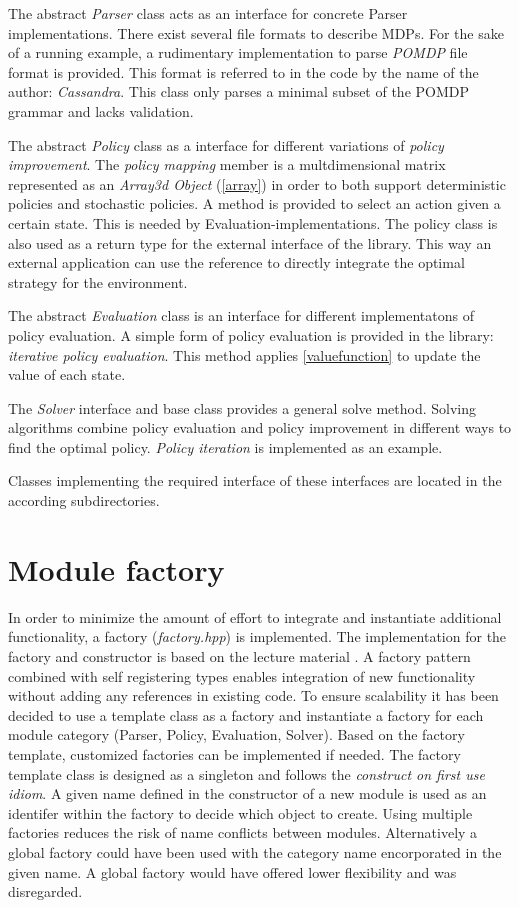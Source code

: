 The abstract \emph{Parser} class acts as an interface for concrete Parser implementations. There exist several file formats to describe MDPs. For the sake of a running example, a rudimentary implementation to parse \emph{POMDP} file format \autocite{Cassandra} is provided. This format is referred to in the code by the name of the author: \emph{Cassandra}. This class only parses a minimal subset of the POMDP grammar and lacks validation. 

The abstract \emph{Policy} class as a interface for different variations of \emph{policy improvement}. The \emph{policy mapping} member is a multdimensional matrix represented as an \emph{Array3d Object} (\autoref{array}) in order to both support deterministic policies and stochastic policies. A method is provided to select an action given a certain state. This is needed by Evaluation-implementations. The policy class is also used as a return type for the external interface of the library. This way an external application can use the reference to directly integrate the optimal strategy for the environment. 

The abstract \emph{Evaluation} class is an interface for different implementatons of policy evaluation. A simple form of policy evaluation is provided in the library: \emph{iterative policy evaluation}. This method applies \autoref{valuefunction} to update the value of each state. 

The \emph{Solver} interface and base class provides a general solve method. Solving algorithms combine policy evaluation and policy improvement in different ways to find the optimal policy. \emph{Policy iteration} is implemented as an example.

Classes implementing the required interface of these interfaces are located in the according subdirectories. 

\section{Module factory}
\label{integration}

In order to minimize the amount of effort to integrate and instantiate additional functionality, a factory (\emph{factory.hpp}) is implemented. The implementation for the factory and constructor is based on the lecture material \autocite{lectureFactory}. A factory pattern combined with self registering types enables integration of new functionality without adding any references in existing code. To ensure scalability it has been decided to use a template class as a factory and instantiate a factory for each module category (Parser, Policy, Evaluation, Solver). Based on the factory template, customized factories can be implemented if needed. The factory template class is designed as a singleton and follows the \emph{construct on first use idiom}. A given name defined in the constructor of a new module is used as an identifer within the factory to decide which object to create. Using multiple factories reduces the risk of name conflicts between modules.  Alternatively a global factory could have been used with the category name encorporated in the given name. A global factory would have offered lower flexibility and was disregarded. 

